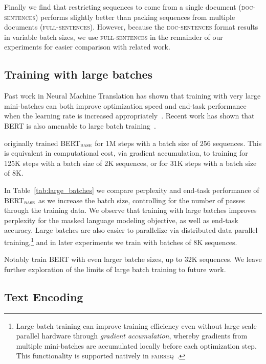Finally we find that restricting sequences to come from a single document (\textsc{doc-sentences}) performs slightly better than packing sequences from multiple documents (\textsc{full-sentences}).
However, because the \textsc{doc-sentences} format results in variable batch sizes, we use \textsc{full-sentences} in the remainder of our experiments for easier comparison with related work.

\subsection{Training with large batches}
\label{sec:large_batches}

Past work in Neural Machine Translation has shown that training with very large mini-batches can both improve optimization speed and end-task performance when the learning rate is increased appropriately~\cite{ott2018scaling}. Recent work has shown that BERT is also amenable to large batch training~\cite{you2019reducing}.

 originally trained BERT$_{\textsc{base}}$ for 1M steps with a batch size of 256 sequences. This is equivalent in computational cost, via gradient accumulation, to training for 125K steps with a batch size of 2K sequences, or for 31K steps with a batch size of 8K.

In Table~\ref{tab:large_batches} we compare perplexity and end-task performance of BERT$_{\textsc{base}}$ as we increase the batch size, controlling for the number of passes through the training data. We observe that training with large batches improves perplexity for the masked language modeling objective, as well as end-task accuracy. Large batches are also easier to parallelize via distributed data parallel training,\footnote{Large batch training can improve training efficiency even without large scale parallel hardware through \emph{gradient accumulation}, whereby gradients from multiple mini-batches are accumulated locally before each optimization step. This functionality is supported natively in \textsc{fairseq}~\cite{ott2019fairseq}.} and in later experiments we train with batches of 8K sequences.

Notably  train BERT with even larger batche sizes, up to 32K sequences. We leave further exploration of the limits of large batch training to future work.

\subsection{Text Encoding}
\label{sec:bpe}

